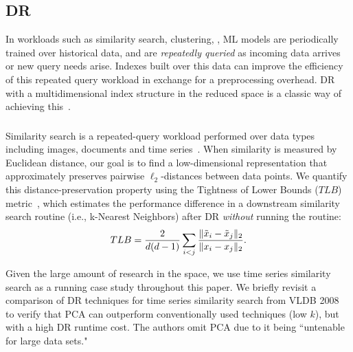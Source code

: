 \subsection{DR }
\label{sec:RQW}

In workloads such as similarity search, clustering, , ML models are periodically trained over historical data, and are \emph{repeatedly queried} as incoming data arrives or new query needs arise. 
Indexes built over this data can improve the efficiency of this repeated query workload in exchange for a preprocessing overhead.
DR with a multidimensional index structure in the reduced space is a classic way of achieving this~\cite{local-dr,dynamic-ss,dm-book,humming-index,decade,search}.



\subsubsection*{}
Similarity search is a repeated-query workload performed over data types including images, documents and time series~\cite{keogh-study,lsh}.
When similarity is measured by Euclidean distance, our goal is to find a low-dimensional representation that approximately preserves pairwise $\ell_2$-distances between data points. We quantify this distance-preservation property using the Tightness of Lower Bounds ($TLB$) metric~\cite{keogh-study}, which estimates the performance difference in a downstream similarity search routine (i.e., k-Nearest Neighbors) after DR \emph{without} running the routine:  
\begin{equation}
\label{eq:tlb}
TLB = \frac{2}{{\color{black}d}({\color{black}d}-1)}\sum_{i<j}\frac{\| \tilde{x}_i -  \tilde{x}_j \|_2 }{\| x_i -  x_j\|_2 }.
\end{equation}

Given the large amount of research in the space, we use time series similarity search as a running case study throughout this paper. 
We briefly revisit a comparison of DR techniques for time series similarity search from VLDB 2008~\cite{keogh-study} to verify that PCA can outperform conventionally used techniques (low $k$), but with a high DR runtime cost.
The authors omit PCA due to it being ``untenable for large data sets." 

